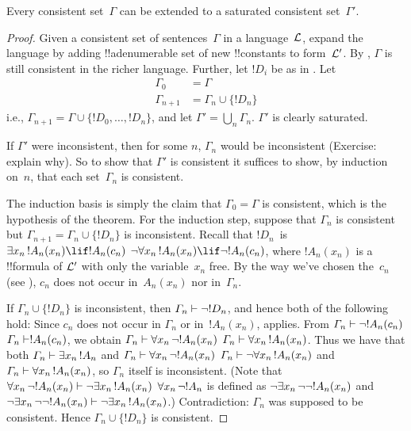 \documentclass[../../../include/open-logic-section]{subfiles}
\begin{document}
\begin{lem}
Every consistent set~$\Gamma$ can be extended to a saturated
consistent set~$\Gamma'$.
\end{lem}

\begin{proof}
Given a consistent set of sentences~$\Gamma$ in a language~$\mathcal L$,
expand the language by adding !!a{denumerable} set of new
!!{constant}s to form~$\mathcal L'$.  By , $\Gamma$
is still consistent in the richer language.  Further, let $!D_i$ be as
in .  Let
\begin{align*}
\Gamma_0 & = \Gamma \\
\Gamma_{n+1} & = \Gamma_n \cup \{!D_n \}
\end{align*}
i.e., $\Gamma_{n+1} = \Gamma \cup \{ !D_0, \dots, !D_n \}$, and let
$\Gamma' = \bigcup_{n} \Gamma_n$.  $\Gamma'$ is clearly saturated.

If $\Gamma'$ were inconsistent, then for some $n$, $\Gamma_n$ would be
inconsistent (Exercise: explain why).  So to show that $\Gamma'$ is
consistent it suffices to show, by induction on~$n$, that each
set~$\Gamma_n$ is consistent.

The induction basis is simply the claim that $\Gamma_0 = \Gamma$ is
consistent, which is the hypothesis of the theorem.  For the induction
step, suppose that $\Gamma_{n}$ is consistent but $\Gamma_{n+1} =
\Gamma_n \cup \{!D_n\}$ is inconsistent.  Recall that $!D_n$~is
{$\lexists[x_{n}][!A_{n}(x_n)] \lif !A_{n}(c_{n})$}
{$\lnot\lforall[x_{n}][!A_{n}(x_n)] \lif \lnot !A_{n}(c_{n})$},
where $!A_n(x_n)$ is a !!{formula} of $\mathcal L'$ with only the
variable~$x_n$ free. By the way we've chosen the~$c_n$ (see
), $c_n$ does not occur in~$A_n(x_n)$ nor
in~$\Gamma_n$.

If $\Gamma_n \cup \{!D_n\}$ is inconsistent, then $\Gamma_n
\Proves \lnot !D_n$, and hence both of the following hold:
Since $c_n$ does not occur in
$\Gamma_n$ or in~$!A_n(x_n)$, 
 applies.
From 
{$\Gamma_n \Proves \lnot !A_n(c_n)$}
{$\Gamma_n \Proves !A_n(c_n)$},
we obtain
{$\Gamma_n \Proves \lforall[x_n][\lnot !A_n(x_n)]$}
{$\Gamma_n \Proves \lforall[x_n][!A_n(x_n)]$}.
Thus we have that both
{$\Gamma_n \Proves \lexists[x_n][!A_n]$ and
$\Gamma_n \Proves \lforall[x_n][\lnot !A_n(x_n)]$}
{$\Gamma_n \Proves \lnot\lforall[x_n][!A_n(x_n)]$ and
$\Gamma_n \Proves \lforall[x_n][!A_n(x_n)]$},
so $\Gamma_n$ itself is inconsistent.
{(Note that
{$\lforall[x_n][\lnot !A_n(x_n)] \Proves
  \lnot\lexists[x_n][!A_n(x_n)]$}
{$\lforall[x_n][\lnot !A_n]$ is defined as
  $\lnot\lexists[x_n][\lnot\lnot !A_n(x_n)]$ and
  $\lnot\lexists[x_n][\lnot\lnot !A_n(x_n)] \Proves
  \lnot\lexists[x_n][!A_n(x_n)]$}.)}{}
Contradiction: $\Gamma_n$ was supposed to be consistent.  Hence
$\Gamma_n \cup \{ !D_n\}$ is consistent.
\end{proof}
\end{document}
